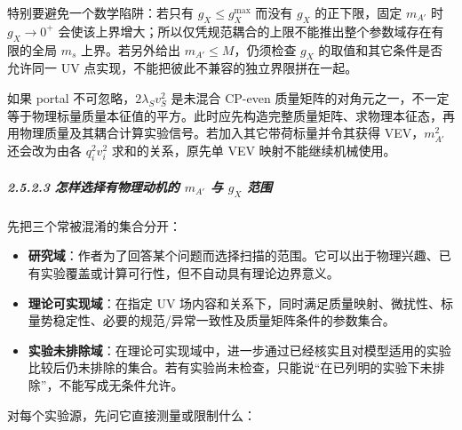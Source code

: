 \documentclass[
]{article}
\providecommand{\tightlist}{%
  \setlength{\itemsep}{0pt}\setlength{\parskip}{0pt}}
\begin{document}
特别要避免一个数学陷阱：若只有 \(g_X\leq g_X^{\max}\) 而没有 \(g_X\)
的正下限，固定 \(m_{A'}\) 时 \(g_X\to0^+\)
会使该上界增大；所以仅凭规范耦合的上限不能推出整个参数域存在有限的全局
\(m_s\) 上界。若另外给出 \(m_{A'}\leq M\)，仍须检查 \(g_X\)
的取值和其它条件是否允许同一 UV
点实现，不能把彼此不兼容的独立界限拼在一起。

如果 portal 不可忽略，\(2\lambda_Sv_S^2\) 是未混合 CP-even
质量矩阵的对角元之一，不一定等于物理标量质量本征值的平方。此时应先构造完整质量矩阵、求物理本征态，再用物理质量及其耦合计算实验信号。若加入其它带荷标量并令其获得
VEV，\(m_{A'}^2\) 还会改为由各 \(q_i^2v_i^2\) 求和的关系，原先单 VEV
映射不能继续机械使用。

\subparagraph{\texorpdfstring{2.5.2.3 怎样选择有物理动机的 \(m_{A'}\) 与
\(g_X\)
范围}{2.5.2.3 怎样选择有物理动机的 m\_\{A\textquotesingle\} 与 g\_X 范围}}\label{ux600eux6837ux9009ux62e9ux6709ux7269ux7406ux52a8ux673aux7684-m_a-ux4e0e-g_x-ux8303ux56f4}

先把三个常被混淆的集合分开：

\begin{itemize}
\tightlist
\item
  \textbf{研究域}：作者为了回答某个问题而选择扫描的范围。它可以出于物理兴趣、已有实验覆盖或计算可行性，但不自动具有理论边界意义。
\item
  \textbf{理论可实现域}：在指定 UV
  场内容和关系下，同时满足质量映射、微扰性、标量势稳定性、必要的规范/异常一致性及质量矩阵条件的参数集合。
\item
  \textbf{实验未排除域}：在理论可实现域中，进一步通过已经核实且对模型适用的实验比较后仍未排除的集合。若有实验尚未检查，只能说``在已列明的实验下未排除''，不能写成无条件允许。
\end{itemize}

对每个实验源，先问它直接测量或限制什么：
\end{document}
